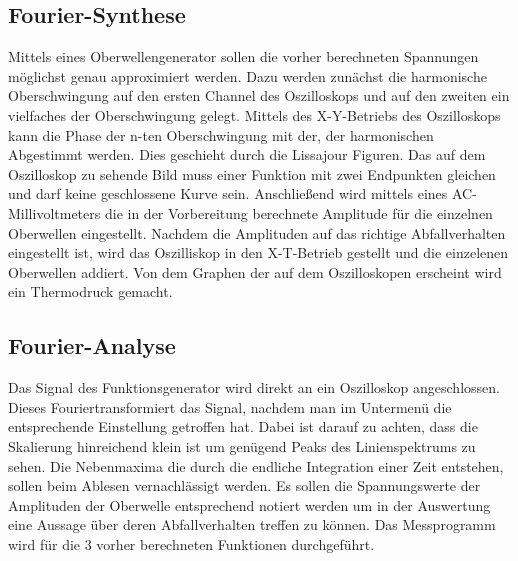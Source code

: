 \subsection{Fourier-Synthese}
Mittels eines Oberwellengenerator sollen die vorher berechneten Spannungen möglichst genau approximiert werden. Dazu werden zunächst die harmonische Oberschwingung auf den ersten Channel des Oszilloskops und auf den zweiten ein vielfaches der Oberschwingung gelegt. Mittels des X-Y-Betriebs des Oszilloskops kann die Phase der n-ten Oberschwingung mit der, der harmonischen Abgestimmt werden. Dies geschieht durch die Lissajour Figuren. Das auf dem Oszilloskop zu sehende Bild muss einer Funktion mit zwei Endpunkten gleichen und darf keine geschlossene Kurve sein. Anschließend wird mittels eines AC-Millivoltmeters die in der Vorbereitung berechnete Amplitude für die einzelnen Oberwellen eingestellt. Nachdem die Amplituden auf das richtige Abfallverhalten eingestellt ist, wird das Oszilliskop in den X-T-Betrieb gestellt und die einzelenen Oberwellen addiert. Von dem Graphen der auf dem Oszilloskopen erscheint wird ein Thermodruck gemacht.
\subsection{Fourier-Analyse}
Das Signal des Funktionsgenerator wird direkt an ein Oszilloskop angeschlossen. Dieses Fouriertransformiert das Signal, nachdem man im Untermenü die entsprechende Einstellung getroffen hat. Dabei ist darauf zu achten, dass die Skalierung hinreichend klein ist um genügend Peaks des Linienspektrums zu sehen. Die Nebenmaxima die durch die endliche Integration einer Zeit entstehen, sollen beim Ablesen vernachlässigt werden. Es sollen die Spannungswerte der Amplituden der Oberwelle entsprechend notiert werden um in der Auswertung eine Aussage über deren Abfallverhalten treffen zu können. Das Messprogramm wird für die 3 vorher berechneten Funktionen durchgeführt.

